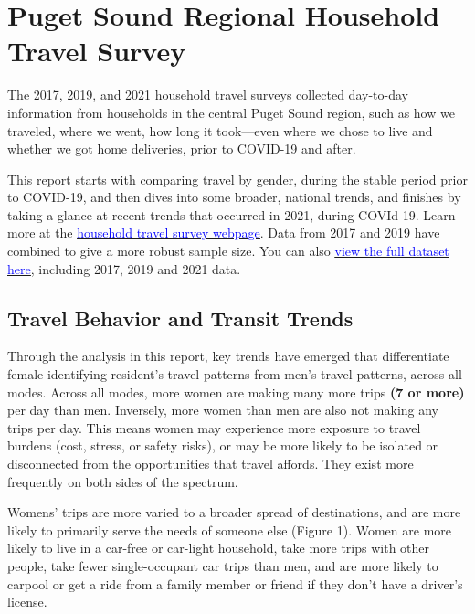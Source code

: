 \documentclass[
  12pt,
]{article}
\begin{document}
\newpage
\setlength{\headheight}{10pt}
\setlength{\textheight}{665pt}
\fancyhead[L]{}

\hypertarget{puget-sound-regional-household-travel-survey}{%
\section{Puget Sound Regional Household Travel
Survey}\label{puget-sound-regional-household-travel-survey}}

\begin{flushleft}
The 2017, 2019, and 2021 household travel surveys collected day-to-day information from households in the central Puget Sound region, such as how we traveled, where we went, how long it took—even where we chose to live and whether we got home deliveries, prior to COVID-19 and after. \smallskip


This report starts with comparing travel by gender, during the stable period prior to COVID-19, and then dives into some broader, national trends, and finishes by taking a glance at recent trends that occurred in 2021, during COVId-19.  Learn more at the \href{https://www.psrc.org/our-work/household-travel-survey-program}{\underline{\textcolor{blue}{household travel survey webpage}}}. Data from 2017 and 2019 have combined to give a more robust sample size.  You can also \href{https://household-travel-survey-psregcncl.hub.arcgis.com}{\underline{\textcolor{blue}{view the full dataset here}}}, including 2017, 2019 and 2021 data. 
\end{flushleft}

\hypertarget{travel-behavior-and-transit-trends}{%
\subsection{Travel Behavior and Transit
Trends}\label{travel-behavior-and-transit-trends}}

\begin{flushleft}
Through the analysis in this report, key trends have emerged that differentiate female-identifying resident’s travel patterns from men’s travel patterns, across all modes. Across all modes, more women are making many more trips \textbf{(7 or more)} per day than men. Inversely, more women than men are also not making any trips per day. This means women may experience more exposure to travel burdens (cost, stress, or safety risks), or may be more likely to be isolated or disconnected from the opportunities that travel affords. They exist more frequently on both sides of the spectrum.

Womens' trips are more varied to a broader spread of destinations, and are more likely to primarily serve the needs of someone else (Figure 1). Women are more likely to live in a car-free or car-light household, take more trips with other people, take fewer single-occupant car trips than men, and are more likely to carpool or get a ride from a family member or friend if they don’t have a driver’s license. 
\end{flushleft}
\end{document}
